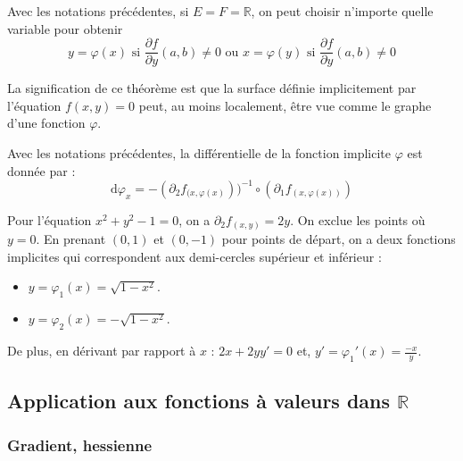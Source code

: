 
	\begin{remark}
		Avec les notations précédentes, si $E = F = \mathbb{R}$, on peut choisir n'importe quelle variable pour obtenir
		\[ y = \varphi(x) \text{ si } \frac{\partial f}{\partial y}(a,b) \neq 0 \text{ ou } x = \varphi(y) \text{ si } \frac{\partial f}{\partial y}(a,b) \neq 0 \]
	\end{remark}


	\begin{remark}
		La signification de ce théorème est que la surface définie implicitement par l'équation $f(x,y)=0$ peut, au moins localement, être vue comme le graphe d'une fonction $\varphi$.
	\end{remark}

	\begin{proposition}
		Avec les notations précédentes, la différentielle de la fonction implicite $\varphi$ est donnée par :
		\[ \mathrm{d}\varphi_x = -(\partial_2 f_{(x, \varphi(x)}))^{-1} \circ (\partial_1 f_{(x, \varphi(x))}) \]
	\end{proposition}

	\begin{example}
		Pour l'équation $x^2 + y^2 - 1 = 0$, on a $\partial_2 f_{(x,y)} = 2y$. On exclue les points où $y = 0$. En prenant $(0,1)$ et $(0,-1)$ pour points de départ, on a deux fonctions implicites qui correspondent aux demi-cercles supérieur et inférieur :
		\begin{itemize}
			\item $y = \varphi_1(x) = \sqrt{1-x^2}$.
			\item $y = \varphi_2(x) = -\sqrt{1-x^2}$.
		\end{itemize}
		De plus, en dérivant par rapport à $x$ : $2x + 2yy' = 0$ et, $y' = \varphi_1'(x) = \frac{-x}{y}$.
	\end{example}

	\subsection{Application aux fonctions à valeurs dans \texorpdfstring{$\mathbb{R}$}{R}}

	\subsubsection{Gradient, hessienne}



